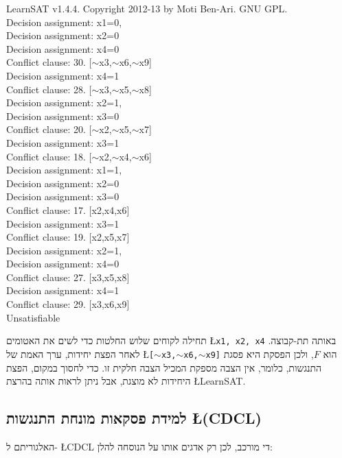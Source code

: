 \documentclass[12pt,a4paper]{article}
\begin{document}
\begin{ttfamily}
LearnSAT v1.4.4. Copyright 2012-13 by Moti Ben-Ari. GNU GPL.\\
Decision assignment: x1=0,\\
Decision assignment: x2=0\\
Decision assignment: x4=0\\
Conflict clause: 30. [$\sim$x3,$\sim$x6,$\sim$x9]\\
Decision assignment: x4=1\\
Conflict clause: 28. [$\sim$x3,$\sim$x5,$\sim$x8]\\
Decision assignment: x2=1,\\
Decision assignment: x3=0\\
Conflict clause: 20. [$\sim$x2,$\sim$x5,$\sim$x7]\\
Decision assignment: x3=1\\
Conflict clause: 18. [$\sim$x2,$\sim$x4,$\sim$x6]\\
Decision assignment: x1=1,\\
Decision assignment: x2=0\\
Decision assignment: x3=0\\
Conflict clause: 17. [x2,x4,x6]\\
Decision assignment: x3=1\\
Conflict clause: 19. [x2,x5,x7]\\
Decision assignment: x2=1,\\
Decision assignment: x4=0\\
Conflict clause: 27. [x3,x5,x8]\\
Decision assignment: x4=1\\
Conflict clause: 29. [x3,x6,x9]\\
Unsatisfiable\\
\end{ttfamily}
תחילה לקוחים שלוש החלטות כדי לשים את האטומים
\L{\texttt{x1, x2, x4}}
באותה תת-קבוצה. לאחר הפצת יחידות, ערך האמת של
\L{\texttt{[$\sim$x3,$\sim$x6,$\sim$x9]}}
הוא
$F$,
ולכן הפסקת היא פסגת התנגשות, כלומר, אין הצבה מספקת המכיל הצבה חלקית זו. כדי לחסוך במקום, הפצת היחידות לא מוצגת, אבל ניתן לראות אותה בהרצת 
\L{LearnSAT}.

\subsection*{למידת פסקאות מונחת התנגשות \L{(CDCL)}}

האלגוריתם ל-%
\L{CDCL}
די מורכב, לכן רק אדגים אותו על הנוסחה להלן:
\end{document}
